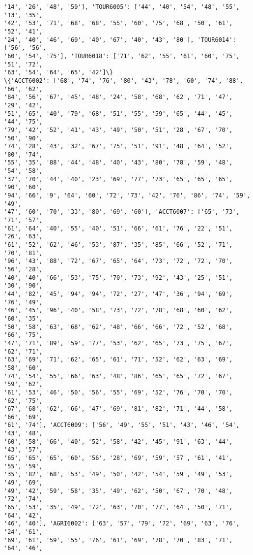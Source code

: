 \documentclass[11pt]{article}
\begin{document}
\begin{Verbatim}[commandchars=\\\{\}]
'14', '26', '48', '59'], 'TOUR6005': ['44', '40', '54', '48', '55', '13', '35',
'42', '53', '71', '68', '68', '55', '60', '75', '68', '50', '61', '52', '41',
'24', '40', '46', '69', '40', '67', '40', '43', '80'], 'TOUR6014': ['56', '56',
'60', '54', '75'], 'TOUR6018': ['71', '62', '55', '61', '60', '75', '51', '72',
'63', '54', '64', '65', '42']\}
\{'ACCT6002': ['68', '74', '76', '80', '43', '78', '60', '74', '88', '66', '62',
'84', '56', '67', '45', '48', '24', '58', '68', '62', '71', '47', '29', '42',
'51', '65', '40', '79', '68', '51', '55', '59', '65', '44', '45', '44', '75',
'79', '42', '52', '41', '43', '49', '50', '51', '28', '67', '70', '50', '90',
'74', '28', '43', '32', '67', '75', '51', '91', '48', '64', '52', '80', '74',
'55', '35', '88', '44', '48', '40', '43', '80', '78', '59', '48', '54', '58',
'37', '70', '44', '40', '23', '69', '77', '73', '65', '65', '65', '90', '60',
'94', '66', '9', '64', '60', '72', '73', '42', '76', '86', '74', '59', '49',
'47', '60', '70', '33', '80', '69', '60'], 'ACCT6007': ['65', '73', '71', '57',
'61', '64', '40', '55', '40', '51', '66', '61', '76', '22', '51', '26', '63',
'61', '52', '62', '46', '53', '87', '35', '85', '66', '52', '71', '70', '81',
'96', '43', '88', '72', '67', '65', '64', '73', '72', '72', '70', '56', '28',
'40', '40', '66', '53', '75', '70', '73', '92', '43', '25', '51', '30', '90',
'44', '82', '45', '94', '94', '72', '27', '47', '36', '94', '69', '76', '49',
'46', '45', '96', '40', '58', '73', '72', '78', '68', '60', '62', '60', '35',
'50', '58', '63', '68', '62', '48', '66', '66', '72', '52', '68', '66', '75',
'47', '71', '89', '59', '77', '53', '62', '65', '73', '75', '67', '62', '71',
'63', '69', '71', '62', '65', '61', '71', '52', '62', '63', '69', '58', '60',
'74', '54', '55', '66', '63', '48', '86', '65', '65', '72', '67', '59', '62',
'61', '53', '46', '50', '56', '55', '69', '52', '76', '70', '70', '62', '75',
'67', '68', '62', '66', '47', '69', '81', '82', '71', '44', '58', '66', '69',
'61', '74'], 'ACCT6009': ['56', '49', '55', '51', '43', '46', '54', '43', '48',
'60', '58', '66', '40', '52', '58', '42', '45', '91', '63', '44', '43', '57',
'65', '65', '65', '60', '56', '28', '69', '59', '57', '61', '41', '55', '59',
'35', '82', '68', '53', '49', '50', '42', '54', '59', '49', '53', '49', '69',
'49', '42', '59', '58', '35', '49', '62', '50', '67', '70', '48', '72', '74',
'65', '53', '35', '49', '72', '63', '70', '77', '64', '50', '71', '64', '42',
'46', '40'], 'AGRI6002': ['63', '57', '79', '72', '69', '63', '76', '24', '61',
'69', '61', '59', '55', '76', '61', '69', '78', '70', '83', '71', '64', '46',

\end{Verbatim}
\end{document}
